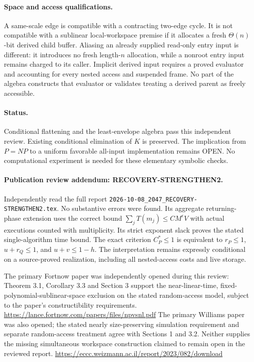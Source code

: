 \documentclass[11pt]{article}
\begin{document}
\paragraph{Space and access qualifications.}
A same-scale edge is compatible with a contracting two-edge cycle. It is
not compatible with a sublinear local-workspace premise if it allocates a
fresh $\Theta(n)$-bit derived child buffer. Aliasing an already supplied
read-only entry input is different: it introduces no fresh length-$n$
allocation, while a nonroot entry input remains charged to its caller.
Implicit derived input requires a proved evaluator and accounting for
every nested access and suspended frame. No part of the algebra constructs
that evaluator or validates treating a derived parent as freely accessible.

\paragraph{Status.}
Conditional flattening and the least-envelope algebra pass this independent
review. Existing conditional elimination of $K$ is preserved. The implication
from $P=NP$ to a uniform favorable all-input implementation remains OPEN.
No computational experiment is needed for these elementary symbolic checks.

\paragraph{Publication review addendum: RECOVERY-STRENGTHEN2.}
Independently read the full report
\nolinkurl{2026-10-08_2047_RECOVERY-STRENGTHEN2.tex}.
No substantive errors were found. Its aggregate returning-phase extension
uses the correct bound $\sum_j T(m_j)\le C M^\epsilon V$ with actual
executions counted with multiplicity. Its strict exponent slack proves the
stated single-algorithm time bound. The exact criterion
$C_P^*\le1$ is equivalent to $r_P\le1$, $u+r_Q\le1$, and
$u+v\le1-h$. The interpretation remains expressly conditional on a
source-proved realization, including all nested-access costs and live storage.

The primary Fortnow paper was independently opened during this review:
Theorem 3.1, Corollary 3.3 and Section 3 support the near-linear-time,
fixed-polynomial-sublinear-space exclusion on the stated random-access
model, subject to the paper's constructibility requirements.
\url{https://lance.fortnow.com/papers/files/npvsnl.pdf}
The primary Williams paper was also opened; the stated nearly
size-preserving simulation requirement and separate random-access treatment
agree with Sections 1 and 3.2. Neither supplies the missing simultaneous
workspace construction claimed to remain open in the reviewed report.
\url{https://eccc.weizmann.ac.il/report/2023/082/download}
\end{document}
